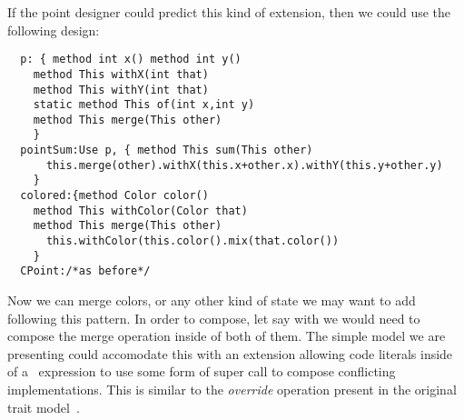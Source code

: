 If the point designer could predict this kind of extension, then we could use the following design:  
\begin{lstlisting}
  p: { method int x() method int y()
    method This withX(int that)
    method This withY(int that)
    static method This of(int x,int y)
    method This merge(This other)
    }
  pointSum:Use p, { method This sum(This other)
      this.merge(other).withX(this.x+other.x).withY(this.y+other.y)
    }
  colored:{method Color color()
    method This withColor(Color that)
    method This merge(This other)
      this.withColor(this.color().mix(that.color())
    }
  CPoint:/*as before*/
\end{lstlisting}  
  Now we can merge colors, or any other kind of state we may want to add
  following this pattern.
  In order to compose, let say \Q@colored@ with \Q@flavored@ we would
  need to compose the merge operation inside of both of them.
  The simple model we are presenting could accomodate this with an
  extension allowing code literals inside of a \use\ expression to use some form of super call to compose conflicting implementations. This is similar to the \emph{override} operation present in the original trait model~\cite{ducasse2006traits}.
  
  